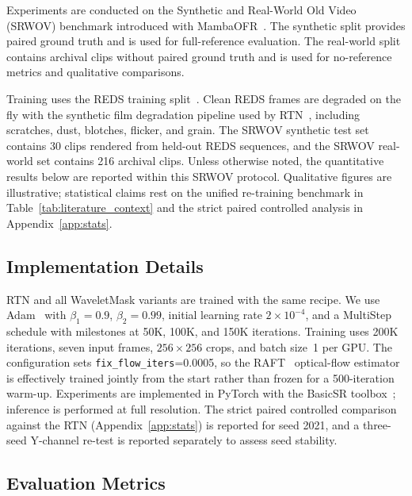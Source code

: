 \documentclass[applsci,article,submit,pdftex,moreauthors]{Definitions/mdpi}
\begin{document}
Experiments are conducted on the Synthetic and Real-World Old Video (SRWOV) benchmark introduced with MambaOFR~\cite{mao2025mambaofr}. The synthetic split provides paired ground truth and is used for full-reference evaluation. The real-world split contains archival clips without paired ground truth and is used for no-reference metrics and qualitative comparisons.

Training uses the REDS training split~\cite{nah2019reds}. Clean REDS frames are degraded on the fly with the synthetic film degradation pipeline used by RTN~\cite{rtn2022}, including scratches, dust, blotches, flicker, and grain. The SRWOV synthetic test set contains 30 clips rendered from held-out REDS sequences, and the SRWOV real-world set contains 216 archival clips. Unless otherwise noted, the quantitative results below are reported within this SRWOV protocol. Qualitative figures are illustrative; statistical claims rest on the unified re-training benchmark in Table~\ref{tab:literature_context} and the strict paired controlled analysis in Appendix~\ref{app:stats}.

\subsection{Implementation Details}\label{subsec:implementation}

RTN and all WaveletMask variants are trained with the same recipe. We use Adam~\cite{kingma2015adam} with $\beta_1=0.9$, $\beta_2=0.99$, initial learning rate $2\times10^{-4}$, and a MultiStep schedule with milestones at 50K, 100K, and 150K iterations. Training uses 200K iterations, seven input frames, $256\times256$ crops, and batch size~1 per GPU. The configuration sets \texttt{fix\_flow\_iters}=0.0005, so the RAFT~\cite{teed2020raft} optical-flow estimator is effectively trained jointly from the start rather than frozen for a 500-iteration warm-up. Experiments are implemented in PyTorch with the BasicSR toolbox~\cite{wang2022basicsr}; inference is performed at full resolution. The strict paired controlled comparison against the RTN (Appendix~\ref{app:stats}) is reported for seed 2021, and a three-seed Y-channel re-test is reported separately to assess seed stability.

\subsection{Evaluation Metrics}\label{subsec:metrics}
\end{document}
